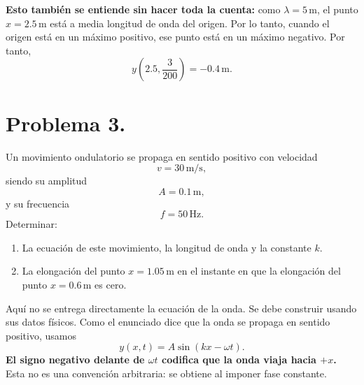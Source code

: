 \documentclass[11pt]{article}
\begin{document}
\textbf{Esto tambi\'en se entiende sin hacer toda la cuenta:} como $\lambda=5\,\mathrm{m}$, el punto $x=2.5\,\mathrm{m}$ est\'a a media longitud de onda del origen. Por lo tanto, cuando el origen est\'a en un m\'aximo positivo, ese punto est\'a en un m\'aximo negativo. Por tanto,
\begin{equation*}
    \boxed{y\left(2.5,\frac{3}{200}\right)=-0.4\,\mathrm{m}}.
\end{equation*}

\clearpage

\section*{Problema 3.}
Un movimiento ondulatorio se propaga en sentido positivo con velocidad
\begin{equation*}
    v=30\,\mathrm{m/s},
\end{equation*}
siendo su amplitud
\begin{equation*}
    A=0.1\,\mathrm{m},
\end{equation*}
y su frecuencia
\begin{equation*}
    f=50\,\mathrm{Hz}.
\end{equation*}
Determinar:
\begin{enumerate}[label=(\alph*)]
    \item La ecuaci\'on de este movimiento, la longitud de onda y la constante $k$.
    \item La elongaci\'on del punto $x=1.05\,\mathrm{m}$ en el instante en que la elongaci\'on del punto $x=0.6\,\mathrm{m}$ es cero.
\end{enumerate}


Aqu\'i no se entrega directamente la ecuaci\'on de la onda. Se debe construir usando sus datos f\'isicos. Como el enunciado dice que la onda se propaga en sentido positivo, usamos
\begin{equation*}
    y(x,t)=A\sin(kx-\omega t).
\end{equation*}
\textbf{El signo negativo delante de $\omega t$ codifica que la onda viaja hacia $+x$.} Esta no es una convenci\'on arbitraria: se obtiene al imponer fase constante.
\end{document}
